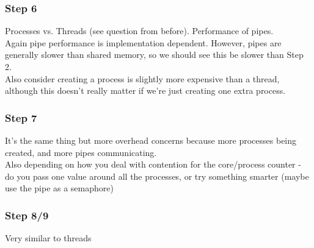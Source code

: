 \documentclass{beamer}
\begin{document}
\begin{frame}
  \frametitle{Step 6}
  Processes vs. Threads (see question from before). Performance of pipes.\\
  \pause
  Again pipe performance is implementation dependent. However, pipes are generally slower than shared memory, so we should see this be slower than Step 2.\\
  Also consider creating a process is slightly more expensive than a thread, although this doesn't really matter if we're just creating one extra process.
\end{frame}
\begin{frame}
  \frametitle{Step 7}
  It's the same thing but more overhead concerns because more processes being created, and more pipes communicating.\\
  Also depending on how you deal with contention for the core/process counter - do you pass one value around all the processes, or try something smarter (maybe use the pipe as a semaphore)
\end{frame}
\begin{frame}
  \frametitle{Step 8/9}
  Very similar to threads
\end{frame}
\end{document}
